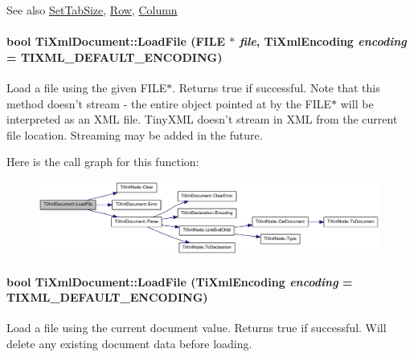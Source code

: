 \begin{DoxySeeAlso}{See also}
\hyperlink{class_ti_xml_document_a51dac56316f89b35bdb7d0d433ba988e}{SetTabSize}, \hyperlink{class_ti_xml_base_a024bceb070188df92c2a8d8852dd0853}{Row}, \hyperlink{class_ti_xml_base_ab54bfb9b70fe6dd276e7b279cab7f003}{Column} 
\end{DoxySeeAlso}
\hypertarget{class_ti_xml_document_a41f6fe7200864d1dca663d230caf8db6}{
\paragraph[{LoadFile}]{\setlength{\rightskip}{0pt plus 5cm}bool TiXmlDocument::LoadFile (FILE $\ast$ {\em file}, \/  TiXmlEncoding {\em encoding} = {\ttfamily TIXML\_\-DEFAULT\_\-ENCODING})}\hfill}
\label{class_ti_xml_document_a41f6fe7200864d1dca663d230caf8db6}
Load a file using the given FILE$\ast$. Returns true if successful. Note that this method doesn't stream -\/ the entire object pointed at by the FILE$\ast$ will be interpreted as an XML file. TinyXML doesn't stream in XML from the current file location. Streaming may be added in the future. 

Here is the call graph for this function:\nopagebreak
\begin{figure}[H]
\begin{center}
\leavevmode
\includegraphics[width=411pt]{class_ti_xml_document_a41f6fe7200864d1dca663d230caf8db6_cgraph}
\end{center}
\end{figure}
\hypertarget{class_ti_xml_document_a4c852a889c02cf251117fd1d9fe1845f}{
\paragraph[{LoadFile}]{\setlength{\rightskip}{0pt plus 5cm}bool TiXmlDocument::LoadFile (TiXmlEncoding {\em encoding} = {\ttfamily TIXML\_\-DEFAULT\_\-ENCODING})}\hfill}
\label{class_ti_xml_document_a4c852a889c02cf251117fd1d9fe1845f}
Load a file using the current document value. Returns true if successful. Will delete any existing document data before loading. 

